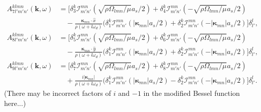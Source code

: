 \documentclass[aps,pre,amsmath,amssymb,floatfix,onecolumn,notitlepage,10pt]{revtex4-1}
\begin{document}
\begin{align}
A^{klmn}_{7l'm'n'}(\mathbf{k}, \omega) &= \Big[ \delta^k_{3} \mathcal{I}_{m'n'}^{mn} \left(\sqrt{\rho\Omega_{lmn}/\mu}a_s/2\right)  + \delta^k_{4} \mathcal{I}_{m'n'}^{mn} \left(-\sqrt{\rho\Omega_{lmn}/\mu}a_s/2\right) \label{lnoslip1}  \nonumber  \\
&\quad - \frac{\bm{\kappa}_{mn}\cdot \hat{x}}{\rho(\omega+l\omega_d)}(\delta^k_{1} \mathcal{I}_{m'n'}^{mn} \left(|\bm{\kappa}_{mn}|a_s/2\right) + \delta^k_{2} \mathcal{I}_{m'n'}^{mn} \left(-|\bm{\kappa}_{mn}|a_s/2\right) \Big]\delta^l_{l'},  \\
A^{klmn}_{8l'm'n'}(\mathbf{k}, \omega) &= \Big[ \delta^k_{5} \mathcal{I}_{m'n'}^{mn} \left(\sqrt{\rho\Omega_{lmn}/\mu}a_s/2\right)  + \delta^k_{6} \mathcal{I}_{m'n'}^{mn} \left(-\sqrt{\rho\Omega_{lmn}/\mu}a_s/2\right)  \nonumber \\
&\quad - \frac{\bm{\kappa}_{mn}\cdot \hat{y}}{\rho(\omega+l\omega_d)}(\delta^k_{1} \mathcal{I}_{m'n'}^{mn} \left(|\bm{\kappa}_{mn}|a_s/2\right) + \delta^k_{2} \mathcal{I}_{m'n'}^{mn} \left(-|\bm{\kappa}_{mn}|a_s/2\right) \Big]\delta^l_{l'},   \label{lnoslip2} \\
A^{klmn}_{9l'm'n'}(\mathbf{k}, \omega) &= \Big[ \delta^k_{7} \mathcal{I}_{m'n'}^{mn} \left(\sqrt{\rho\Omega_{lmn}/\mu}a_s/2\right)  + \delta^k_{8} \mathcal{I}_{m'n'}^{mn} \left(-\sqrt{\rho\Omega_{lmn}/\mu}a_s/2\right) \nonumber \\
&\quad + \frac{i|\bm{\kappa}_{mn}|}{\rho(\omega+l\omega_d)}(\delta^k_{1} \mathcal{I}_{m'n'}^{mn} \left(|\bm{\kappa}_{mn}|a_s/2\right) - \delta^k_{2} \mathcal{I}_{m'n'}^{mn} \left(-|\bm{\kappa}_{mn}|a_s/2\right) \Big]\delta^l_{l'}. \label{lnoslip3}
\end{align}
(There may be incorrect factors of $i$ and $-1$ in the modified Bessel function here...)
\end{document}
